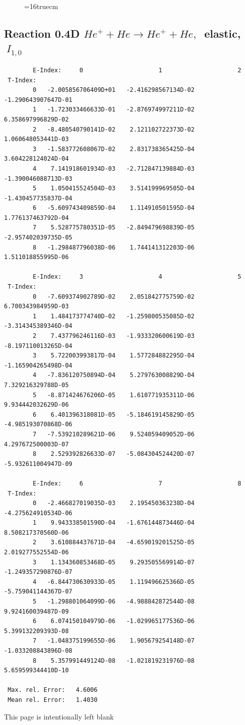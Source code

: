\documentclass[12pt,dvips]{article}
\begin{document}
\begin{figure} \label{0.4T}
\epsfxsize=16truecm
\end{figure}
\newpage

\subsection{
Reaction 0.4D  $He^+ + He \rightarrow He^+ + He ,\ $
 elastic, $\  I_{1,0}$
}

\begin{small}\begin{verbatim}
        E-Index:     0                     1                     2
 T-Index:
        0   -2.005856706409D+01   -2.416298567134D-02   -1.290643907647D-01
        1   -1.723033466633D-01   -2.876974997211D-02    6.358697996829D-02
        2   -8.480540790141D-02    2.121102722373D-02    1.060648053441D-03
        3   -1.583772608067D-02    2.831738365425D-04    3.604228124024D-04
        4    7.141918601934D-03   -2.712847139884D-03   -1.390046088713D-03
        5    1.050415524504D-03    3.514199969505D-04   -1.430457735837D-04
        6   -5.609743409859D-04    1.114910501595D-04    1.776137463792D-04
        7    5.528775780351D-05   -2.849479698839D-05   -2.957402039735D-05
        8   -1.298487796038D-06    1.744141312203D-06    1.511018855995D-06

        E-Index:     3                     4                     5
 T-Index:
        0   -7.609374902789D-02    2.051842775759D-02    6.700343984959D-03
        1    1.484173774740D-02   -1.259800535085D-02   -3.314345389346D-04
        2    7.437796246116D-03   -1.933320600619D-03   -8.197110013265D-04
        3    5.722003993817D-04    1.577284882295D-04   -1.165904265498D-04
        4   -7.836120750894D-04    5.279763008829D-04    7.329216329788D-05
        5   -8.871424676206D-05    1.610771935311D-06    9.934442032629D-06
        6    6.401396318081D-05   -5.184619145829D-05   -4.985193070868D-06
        7   -7.539210289621D-06    9.524059409052D-06    4.297672500003D-07
        8    2.529392826633D-07   -5.084304524420D-07   -5.932611004947D-09

        E-Index:     6                     7                     8
 T-Index:
        0   -2.466827019035D-03    2.195450363238D-04   -4.275624910534D-06
        1    9.943338501590D-04   -1.676144873446D-04    8.508217370560D-06
        2    3.610884437671D-04   -4.659019201525D-05    2.019277552554D-06
        3    1.134360853468D-05    9.293505569914D-07   -1.249357290876D-07
        4   -6.844730630933D-05    1.119496625366D-05   -5.759041144367D-07
        5   -1.298801064099D-06   -4.988842872544D-08    9.924160039487D-09
        6    6.074150104979D-06   -1.029965177536D-06    5.399132209393D-08
        7   -1.048375199655D-06    1.905679254148D-07   -1.033208843896D-08
        8    5.357991449124D-08   -1.021819231976D-08    5.659599344410D-10

 Max. rel. Error:   4.6006
 Mean rel. Error:   1.4030

\end{verbatim}\end{small}
\newpage
This page is intentionally left blank
\newpage
\end{document}
